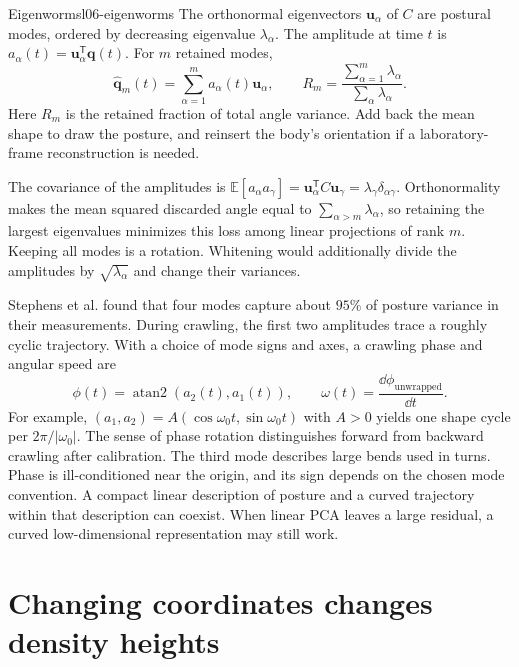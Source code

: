 \begin{definition}{Eigenworms}{l06-eigenworms}
The orthonormal eigenvectors $\mathbf u_\alpha$ of $C$ are postural modes, ordered by decreasing eigenvalue $\lambda_\alpha$. The amplitude at time $t$ is $a_\alpha(t)=\mathbf u_\alpha^{\mathsf T}\mathbf q(t)$. For $m$ retained modes,
\begin{equation}
 \widehat{\mathbf q}_m(t)=\sum_{\alpha=1}^{m}a_\alpha(t)\mathbf u_\alpha,
 \qquad
 R_m=\frac{\sum_{\alpha=1}^{m}\lambda_\alpha}{\sum_\alpha\lambda_\alpha}.
 \label{eq:l06-worm-reconstruction}
\end{equation}
Here $R_m$ is the retained fraction of total angle variance. Add back the mean shape to draw the posture, and reinsert the body's orientation if a laboratory-frame reconstruction is needed.
\end{definition}

The covariance of the amplitudes is $\mathbb E[a_\alpha a_\gamma]=\mathbf u_\alpha^{\mathsf T}C\mathbf u_\gamma=\lambda_\gamma\delta_{\alpha\gamma}$. Orthonormality makes the mean squared discarded angle equal to $\sum_{\alpha>m}\lambda_\alpha$, so retaining the largest eigenvalues minimizes this loss among linear projections of rank $m$. Keeping all modes is a rotation. Whitening would additionally divide the amplitudes by $\sqrt{\lambda_\alpha}$ and change their variances.

Stephens et al. found that four modes capture about $95\%$ of posture variance in their measurements. During crawling, the first two amplitudes trace a roughly cyclic trajectory. With a choice of mode signs and axes, a crawling phase and angular speed are
\begin{equation}
 \phi(t)=\operatorname{atan2}(a_2(t),a_1(t)),\qquad
 \omega(t)=\frac{\dd\phi_{\mathrm{unwrapped}}}{\dd t}.
 \label{eq:l06-worm-phase}
\end{equation}
For example, $(a_1,a_2)=A(\cos\omega_0t,\sin\omega_0t)$ with $A>0$ yields one shape cycle per $2\pi/|\omega_0|$. The sense of phase rotation distinguishes forward from backward crawling after calibration. The third mode describes large bends used in turns. Phase is ill-conditioned near the origin, and its sign depends on the chosen mode convention. A compact linear description of posture and a curved trajectory within that description can coexist. When linear PCA leaves a large residual, a curved low-dimensional representation may still work.

\section{Changing coordinates changes density heights}
\label{sec:l06-jacobian}

